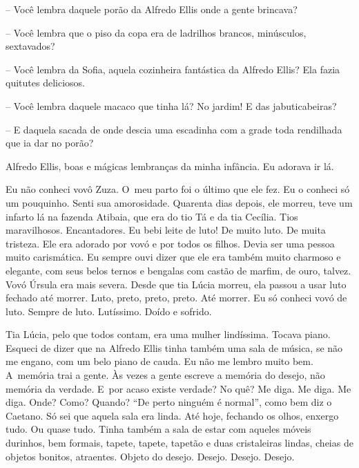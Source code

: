 -- Você lembra daquele porão da Alfredo Ellis onde a gente brincava?

-- Você lembra que o piso da copa era de ladrilhos brancos, minúsculos,
sextavados?

-- Você lembra da Sofia, aquela cozinheira fantástica da Alfredo Ellis?
Ela fazia quitutes deliciosos.

-- Você lembra daquele macaco que tinha lá? No jardim! E das
jabuticabeiras?

-- E daquela sacada de onde descia uma escadinha com a grade toda
rendilhada que ia dar no porão?

Alfredo Ellis, boas e mágicas lembranças da minha infância. Eu adorava
ir lá.

Eu não conheci vovô Zuza. O~meu parto foi o último que ele fez. Eu o
conheci só um pouquinho. Senti sua amorosidade. Quarenta dias depois,
ele morreu, teve um infarto lá na fazenda Atibaia, que era do tio Tá e
da tia Cecília. Tios maravilhosos. Encantadores. Eu bebi leite de luto!
De muito luto. De muita tristeza. Ele era adorado por vovó e por todos
os filhos. Devia ser uma pessoa muito carismática. Eu sempre ouvi dizer
que ele era também muito charmoso e elegante, com seus belos ternos e
bengalas com castão de marfim, de ouro, talvez. Vovó Úrsula era mais
severa. Desde que tia Lúcia morreu, ela passou a usar luto fechado até
morrer. Luto, preto, preto, preto. Até morrer. Eu só conheci vovó de
luto. Sempre de luto. Lutíssimo. Doído e sofrido.

Tia Lúcia, pelo que todos contam, era uma mulher lindíssima. Tocava
piano. Esqueci de dizer que na Alfredo Ellis tinha também uma sala de
música, se não me engano, com um belo piano de cauda. Eu não me lembro
muito bem. A~memória trai a gente. Às vezes a gente escreve a memória do
desejo, não memória da verdade. E~por acaso existe verdade? No quê? Me
diga. Me diga. Me diga. Onde? Como? Quando? ``De perto ninguém é
normal'', como bem diz o Caetano. Só sei que aquela sala era linda. Até
hoje, fechando os olhos, enxergo tudo. Ou quase tudo. Tinha também a
sala de estar com aqueles móveis durinhos, bem formais, tapete, tapete,
tapetão e duas cristaleiras lindas, cheias de objetos bonitos,
atraentes. Objeto do desejo. Desejo. Desejo. Desejo.


